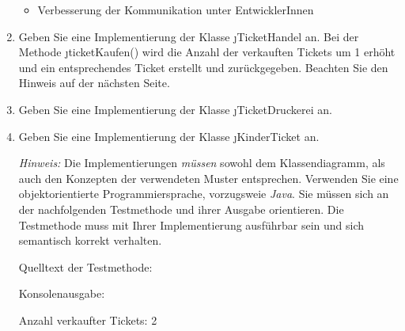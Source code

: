 \documentclass{bschlangaul-aufgabe}
\begin{document}
\begin{enumerate}
\begin{bAntwort}
\begin{itemize}
\item Verbesserung der Kommunikation unter EntwicklerInnen
\end{itemize}
\end{bAntwort}


\item Geben Sie eine Implementierung der Klasse \j{TicketHandel} an. Bei
der Methode \j{ticketKaufen()} wird die Anzahl der verkauften Tickets um
1 erhöht und ein entsprechendes Ticket erstellt und zurückgegeben.
Beachten Sie den Hinweis auf der nächsten Seite.

\begin{bAntwort}
\end{bAntwort}


\item Geben Sie eine Implementierung der Klasse \j{TicketDruckerei} an.

\begin{bAntwort}
\end{bAntwort}


\item Geben Sie eine Implementierung der Klasse \j{KinderTicket} an.

\begin{bAntwort}
\end{bAntwort}

\emph{Hinweis:} Die Implementierungen \emph{müssen} sowohl dem
Klassendiagramm, als auch den Konzepten der verwendeten Muster
entsprechen. Verwenden Sie eine objektorientierte Programmiersprache,
vorzugsweie \emph{Java}. Sie müssen sich an der nachfolgenden
Testmethode und ihrer Ausgabe orientieren. Die Testmethode muss mit
Ihrer Implementierung ausführbar sein und sich semantisch korrekt
verhalten.

Quelltext der Testmethode:


Konsolenausgabe:

Anzahl verkaufter Tickets: 2

\end{enumerate}
\end{document}
